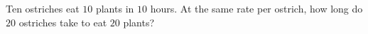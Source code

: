 Ten ostriches eat $10$ plants in $10$ hours. At the same rate per ostrich, how long do $20$ ostriches take to eat $20$ plants?

